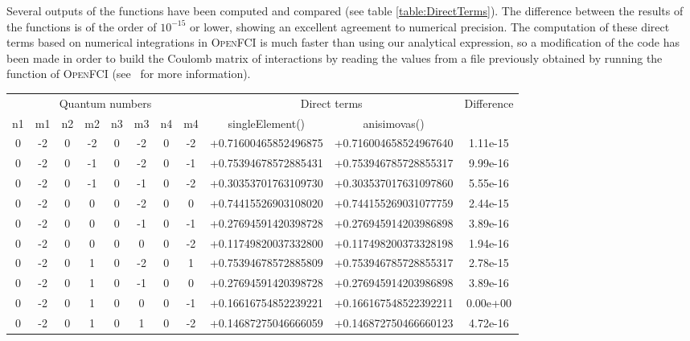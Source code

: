Several outputs of the functions have been computed and compared (see table \ref{table:DirectTerms}). The difference between the results of the functions is of the order of $10^{-15}$ or lower, showing an excellent agreement to numerical precision. The computation of these direct terms based on numerical integrations in \textsc{OpenFCI} is much faster than using our analytical expression, so a modification of the code has been made in order to build the Coulomb matrix of interactions by reading the values from a file previously obtained by running the  function of \textsc{OpenFCI} (see~\cite{siteSimen} for more information).

\begin{table}[ht]
\centering      %
{\scriptsize
\begin{tabular}{c|c|c|c|c|c|c|c|c|c|c}  %
\toprule[1pt]
\multicolumn{8}{c}{Quantum numbers} & \multicolumn{2}{|c|}{Direct terms } & Difference \\
n1 & m1 & n2 & m2 & n3 & m3 & n4 & m4 & singleElement() & anisimovas() &    \\
\hline                    %
0 & -2 & 0 & -2 & 0 & -2 & 0 & -2 &  +0.71600465852496875 & +0.716004658524967640 &   1.11e-15   \\
0 & -2 & 0 & -1 & 0 & -2 & 0 & -1 &  +0.75394678572885431 & +0.753946785728855317 &   9.99e-16   \\
0 & -2 & 0 & -1 & 0 & -1 & 0 & -2 &  +0.30353701763109730 & +0.303537017631097860 &   5.55e-16   \\
0 & -2 & 0 & 0 & 0 & -2 & 0 & 0 &  +0.74415526903108020 & +0.744155269031077759 &   2.44e-15   \\
0 & -2 & 0 & 0 & 0 & -1 & 0 & -1 &  +0.27694591420398728 & +0.276945914203986898 &   3.89e-16   \\
0 & -2 & 0 & 0 & 0 & 0 & 0 & -2 &  +0.11749820037332800 & +0.117498200373328198 &   1.94e-16   \\
0 & -2 & 0 & 1 & 0 & -2 & 0 & 1 &  +0.75394678572885809 & +0.753946785728855317 &   2.78e-15   \\
0 & -2 & 0 & 1 & 0 & -1 & 0 & 0 &  +0.27694591420398728 & +0.276945914203986898 &   3.89e-16   \\
0 & -2 & 0 & 1 & 0 & 0 & 0 & -1 &  +0.16616754852239221 & +0.166167548522392211 &   0.00e+00   \\
0 & -2 & 0 & 1 & 0 & 1 & 0 & -2 &  +0.14687275046666059 & +0.146872750466660123 &   4.72e-16   \\

\end{tabular}}
\end{table}
